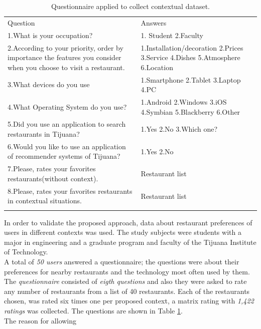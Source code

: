 \begin{table}
\small
\captionsetup{font=footnotesize}
\caption{Questionnaire applied to collect contextual dataset.}
\label{tab:questions} 
\centering
\small
\begin{tabular}{p{7cm} p{5cm} }
\hline\noalign{\smallskip}
Question & Answers \\
\noalign{\smallskip}\hline\noalign{\smallskip}
\small{1.What is your occupation?} & \small{1. Student 2.Faculty} \\ \hline  
\small{2.According to your priority, order by importance the features 
you consider when you choose to visit a restaurant.} & 
\small{1.Installation/decoration 2.Prices 3.Service 4.Dishes
5.Atmosphere 6.Location} \\ \hline  
\small{3.What devices do you use} &
\small{1.Smartphone 2.Tablet 3.Laptop 4.PC} \\ \hline   
\small{4.What Operating System do you use?} & 
\small{1.Android 2.Windows 3.iOS 4.Symbian 5.Blackberry 6.Other}
\\ \hline  
\small{5.Did you use an application to search restaurants in Tijuana?} &
\small{1.Yes 2.No 3.Which one?} \\ \hline   
\small{6.Would you like to use an application of
recommender systems of Tijuana?} & \small{1.Yes 2.No} \\ \hline  
\small{7.Please, rates your favorites restaurants(without context).} & 
\small{Restaurant list} \\ \hline
\small{8.Please, rates your favorites restaurants in contextual situations.} & 
\small{Restaurant list} \\
\noalign{\smallskip}\hline
\end{tabular}
\end{table}
In order to validate the proposed approach,  data  about 
restaurant preferences of users in different contexts was used.
The study subjects were students  with a major in engineering and  
a graduate program and faculty of the Tijuana Institute of
Technology.\\ A total of \textit{50 users} answered a questionnaire; the
questions were about their preferences for nearby restaurants and the
technology most often used by them. The \textit{questionnaire} consisted 
of \textit{eigth questions} and also they were asked to rate any number 
of restaurants from a list of 40 restaurants.
Each of the restaurants chosen, was rated six times one per proposed 
context, a matrix rating with \textit{1,422 ratings} was collected. The
questions are shown in Table  \ref{tab:questions}. \\The reason for allowing

